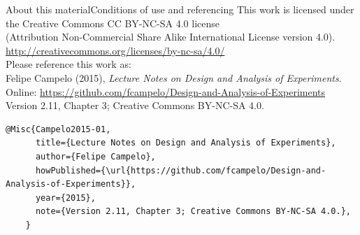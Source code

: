 \documentclass[t]{beamer}
\begin{document}
\begin{ftstf}{About this material}{Conditions of use and referencing}
\centering\footnotesize This work is licensed under the Creative Commons CC BY-NC-SA 4.0 license\\(Attribution Non-Commercial Share Alike International License version 4.0).\\
\vhalf
\url{http://creativecommons.org/licenses/by-nc-sa/4.0/}\\
\vone
\footnotesize Please reference this work as:\\
\footnotesize \flushleft Felipe Campelo (2015), \textit{Lecture Notes on Design and Analysis of Experiments}.\\Online: {\scriptsize\url{https://github.com/fcampelo/Design-and-Analysis-of-Experiments}}\\
Version 2.11, Chapter 3; Creative Commons BY-NC-SA 4.0.\\

\begin{Verbatim}[fontsize=\tiny]
    @Misc{Campelo2015-01,
      title={Lecture Notes on Design and Analysis of Experiments},
      author={Felipe Campelo},
      howPublished={\url{https://github.com/fcampelo/Design-and-Analysis-of-Experiments}},
      year={2015},
      note={Version 2.11, Chapter 3; Creative Commons BY-NC-SA 4.0.},
    }
\end{Verbatim}

\end{ftstf}
\end{document}
